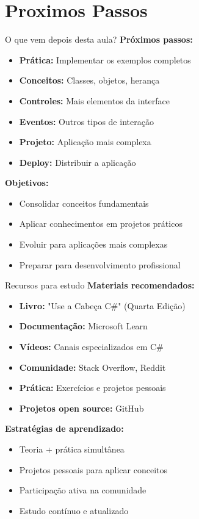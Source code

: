 \documentclass[aspectratio=169]{beamer}
\begin{document}
\section{Proximos Passos}

\begin{frame}{O que vem depois desta aula?}
\textbf{Próximos passos:}
\begin{itemize}
    \item \textbf{Prática:} Implementar os exemplos completos
    \item \textbf{Conceitos:} Classes, objetos, herança
    \item \textbf{Controles:} Mais elementos da interface
    \item \textbf{Eventos:} Outros tipos de interação
    \item \textbf{Projeto:} Aplicação mais complexa
    \item \textbf{Deploy:} Distribuir a aplicação
\end{itemize}

\textbf{Objetivos:}
\begin{itemize}
    \item Consolidar conceitos fundamentais
    \item Aplicar conhecimentos em projetos práticos
    \item Evoluir para aplicações mais complexas
    \item Preparar para desenvolvimento profissional
\end{itemize}
\end{frame}

\begin{frame}{Recursos para estudo}
\textbf{Materiais recomendados:}
\begin{itemize}
    \item \textbf{Livro:} "Use a Cabeça C\#" (Quarta Edição)
    \item \textbf{Documentação:} Microsoft Learn
    \item \textbf{Vídeos:} Canais especializados em C\#
    \item \textbf{Comunidade:} Stack Overflow, Reddit
    \item \textbf{Prática:} Exercícios e projetos pessoais
    \item \textbf{Projetos open source:} GitHub
\end{itemize}

\textbf{Estratégias de aprendizado:}
\begin{itemize}
    \item Teoria + prática simultânea
    \item Projetos pessoais para aplicar conceitos
    \item Participação ativa na comunidade
    \item Estudo contínuo e atualizado
\end{itemize}
\end{frame}
\end{document}
